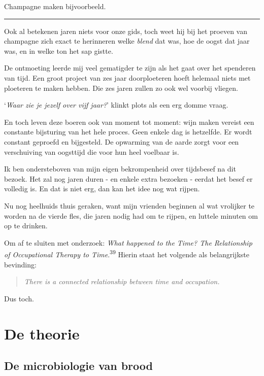 \documentclass[
  11pt,
  dutch,
]{memoir}
\begin{document}
Champagne maken bijvoorbeeld.

\pfbreak

Ook al betekenen jaren niets voor onze gids, toch weet hij bij het
proeven van champagne zich exact te herinneren welke \emph{blend} dat
was, hoe de oogst dat jaar was, en in welke ton het sap gistte.

De ontmoeting leerde mij veel gematigder te zijn als het gaat over het
spenderen van tijd. Een groot project van zes jaar doorploeteren hoeft
helemaal niets met ploeteren te maken hebben. Die zes jaren zullen zo
ook wel voorbij vliegen.

`\emph{Waar zie je jezelf over vijf jaar?}' klinkt plots als een erg
domme vraag.

En toch leven deze boeren ook van moment tot moment: wijn maken vereist
een constante bijsturing van het hele proces. Geen enkele dag is
hetzelfde. Er wordt constant geproefd en bijgesteld. De opwarming van de
aarde zorgt voor een verschuiving van oogsttijd die voor hun heel
voelbaar is.

Ik ben ondersteboven van mijn eigen bekrompenheid over tijdsbesef na dit
bezoek. Het zal nog jaren duren - en enkele extra bezoeken - eerdat het
besef er volledig is. En dat is niet erg, dan kan het idee nog wat
rijpen.

Nu nog heelhuids thuis geraken, want mijn vrienden beginnen al wat
vrolijker te worden na de vierde fles, die jaren nodig had om te rijpen,
en luttele minuten om op te drinken.

Om af te sluiten met onderzoek: \emph{What happened to the Time? The
Relationship of Occupational Therapy to Time}.\textsuperscript{39}
Hierin staat het volgende als belangrijkste bevinding:

\begin{quote}
\emph{There is a connected relationship between time and occupation.}
\end{quote}

Dus toch.

\hypertarget{de-theorie}{%
\part{De theorie}\label{de-theorie}}

\label{theorie}

\hypertarget{de-microbiologie-van-brood}{%
\chapter{De microbiologie van brood}\label{de-microbiologie-van-brood}}
\end{document}
